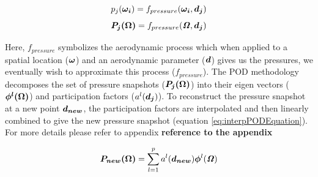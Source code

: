 \begin{equation} \label{eq:pijSnapshot}
p_{j}(\boldsymbol{\omega_{i}}) = f_{pressure}(\boldsymbol{\omega_{i}}, \boldsymbol{d_{j}})
\end{equation} 
\begin{equation}\label{eq:pressurefield}
\boldsymbol{P_{j}(\Omega)} = f_{pressure}(\bm{\mathit{\Omega}}, \boldsymbol{d_{j}})
\end{equation} 

Here, $f_{pressure}$ symbolizes the aerodynamic process which when applied to a spatial location ($\boldsymbol{\omega}$) and an aerodynamic parameter ($\boldsymbol{d}$) gives us the pressures, we eventually wish to approximate this process ($f_{pressure}$). The POD methodology decomposes the set of pressure snapshots ($\boldsymbol{P_{j}(\Omega)}$) into their eigen vectors ($\boldsymbol{\phi^{l}(\Omega)}$) and participation factors ($a^{l}(\boldsymbol{d_{j}})$). To reconstruct the pressure snapshot at a new point $\boldsymbol{d_{new}}$, the participation factors are interpolated and then linearly combined to give the new pressure snapshot (equation \ref{eq:interpPODEquation}). For more details please refer to appendix \textbf{reference to the appendix}

\begin{equation}\label{eq:interpPODEquation}
\boldsymbol{P_{new}(\Omega)} = \sum_{l=1}^{p}a^{l}(\boldsymbol{d_{new}}) \boldsymbol{\phi}^l(\bm{\mathit{\Omega}})
\end{equation}

